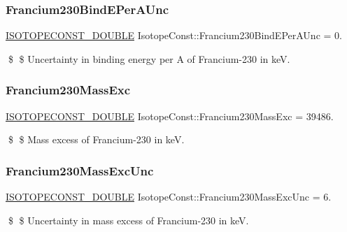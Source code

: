 \subsubsection{\texorpdfstring{Francium230\+Bind\+E\+Per\+A\+Unc}{Francium230BindEPerAUnc}}
{\footnotesize\ttfamily \mbox{\hyperlink{group___isotope_const-_macros_ga8f45a7272ce02c0b4c65c44636ed719a}{I\+S\+O\+T\+O\+P\+E\+C\+O\+N\+S\+T\+\_\+\+D\+O\+U\+B\+LE}} Isotope\+Const\+::\+Francium230\+Bind\+E\+Per\+A\+Unc = 0.}

\$ \$ Uncertainty in binding energy per A of Francium-\/230 in keV. \mbox{\label{group___isotope_const-_francium-_fr230_gad00e1d6bdacf02483f502853d07743cf}} 
\subsubsection{\texorpdfstring{Francium230\+Mass\+Exc}{Francium230MassExc}}
{\footnotesize\ttfamily \mbox{\hyperlink{group___isotope_const-_macros_ga8f45a7272ce02c0b4c65c44636ed719a}{I\+S\+O\+T\+O\+P\+E\+C\+O\+N\+S\+T\+\_\+\+D\+O\+U\+B\+LE}} Isotope\+Const\+::\+Francium230\+Mass\+Exc = 39486.}

\$ \$ Mass excess of Francium-\/230 in keV. \mbox{\label{group___isotope_const-_francium-_fr230_gab18332994aa46574af59802a34cffe9d}} 
\subsubsection{\texorpdfstring{Francium230\+Mass\+Exc\+Unc}{Francium230MassExcUnc}}
{\footnotesize\ttfamily \mbox{\hyperlink{group___isotope_const-_macros_ga8f45a7272ce02c0b4c65c44636ed719a}{I\+S\+O\+T\+O\+P\+E\+C\+O\+N\+S\+T\+\_\+\+D\+O\+U\+B\+LE}} Isotope\+Const\+::\+Francium230\+Mass\+Exc\+Unc = 6.}

\$ \$ Uncertainty in mass excess of Francium-\/230 in keV. \mbox{\label{group___isotope_const-_francium-_fr230_ga684decb342353e1a3ecfcb42ea7ab300}} 
